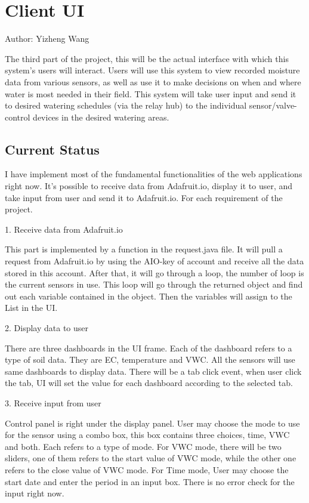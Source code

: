 \documentclass[onecolumn, draftclsnofoot,10pt, compsoc]{IEEEtran}
\begin{document}
    \section{Client UI}
    Author: Yizheng Wang
    
    The third part of the project, this will be the actual interface with which this system’s users will interact. Users will use this system to view recorded moisture data from various sensors, as well as use it to make decisions on when and where water is most needed in their field. This system will take user input and send it to desired watering schedules (via the relay hub) to the individual sensor/valve-control devices in the desired watering areas.
   	\subsection{Current Status}%
    I have implement most of the fundamental functionalities of the web applications right now. It’s possible to receive data from Adafruit.io, display it to user, and take input from user and send it to Adafruit.io. 
For each requirement of the project.

	1.	Receive data from Adafruit.io
    	
    	This part is implemented by a function in the request.java file. It will pull a request from Adafruit.io by using the AIO-key of account and receive all the data stored in this account. After that, it will go through a loop, the number of loop is the current sensors in use. This loop will go through the returned object and find out each variable contained in the object. Then the variables will assign to the List in the UI.
        
     2.	Display data to user
     
     There are three dashboards in the UI frame. Each of the dashboard refers to a type of soil data. They are EC, temperature and VWC. All the sensors will use same dashboards to display data. There will be a tab click event, when user click the tab, UI will set the value for each dashboard according to the selected tab. 
     
     3.	Receive input from user
     
     Control panel is right under the display panel. User may choose the mode to use for the sensor using a combo box, this box contains three choices, time, VWC and both. Each refers to a type of mode. For VWC mode, there will be two sliders, one of them refers to the start value of VWC mode, while the other one refers to the close value of VWC mode.
For Time mode, User may choose the start date and enter the period in an input box. There is no error check for the input right now.
\end{document}
